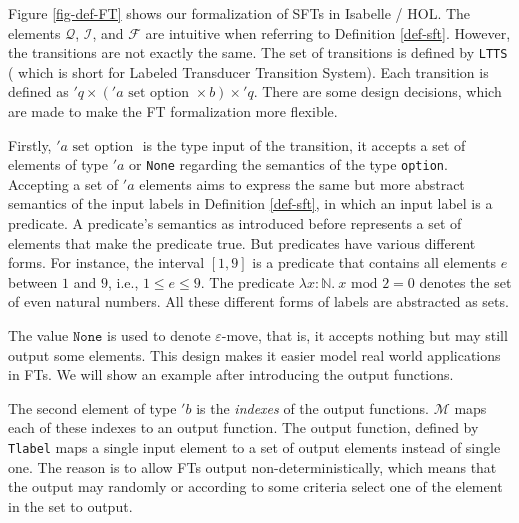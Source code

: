 \documentclass[a4paper,UKenglish,cleveref, autoref, thm-restate]{lipics-v2021}
\begin{document}
Figure \ref{fig-def-FT} shows our formalization of SFTs in Isabelle / HOL. The elements $\mathcal{Q}$, $\mathcal{I}$, and $\mathcal{F}$ are intuitive when referring to Definition \ref{def-sft}. However, the transitions are not exactly the same. 
%
The set of transitions is defined by \texttt{LTTS} ( which is short for Labeled Transducer Transition System). Each transition is defined as $'q \times ('a \text{ set option }\times b) \times 'q$. There are some design decisions, which are made to make the FT formalization more flexible.

Firstly, $'a \text{ set option }$ is the type input of the transition, it accepts a set of elements of type $'a$ or \texttt{None} regarding the semantics of the type \texttt{option}. 
Accepting a set of $'a$ elements aims to express the same but more abstract semantics of the input labels in Definition \ref{def-sft}, in which an input label is a predicate. A predicate's semantics as introduced before represents a set of elements that make the predicate true. But predicates have various different forms. For instance, the interval $[1, 9]$ is a predicate that contains all elements $e$ between $1$ and $9$, i.e., $1 \leq e \leq 9$. The predicate $\lambda x : \mathbb{N}.~ x \text{ mod } 2 = 0$ denotes the set of even natural numbers. All these different forms of labels are abstracted as sets.

%
The value $\texttt{None}$ is used to denote $\varepsilon$-move, that is, it accepts nothing but may still output some elements. This design makes it easier model real world applications in FTs. We will show an example after introducing the output functions. 

The second element of type $'b$ is the \emph{indexes} of the output functions.  $\mathcal{M}$ maps each of these indexes to an output function. The output function, defined by \texttt{Tlabel} maps a single input element to a set of output elements instead of single one. The reason is to allow FTs output non-deterministically, which means that the output may randomly or according to some criteria select one of the element in the set to output.
\end{document}
